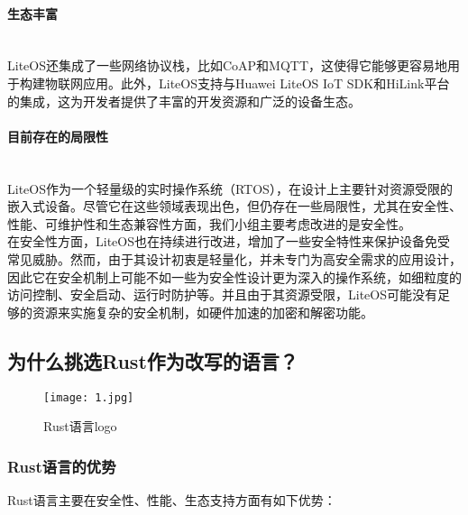 \documentclass{ctexart}
\begin{document}
\paragraph{生态丰富} \ \\
\indent LiteOS还集成了一些网络协议栈，比如CoAP和MQTT，这使得它能够更容易地用于构建物联网应用。此外，LiteOS支持与Huawei LiteOS IoT SDK和HiLink平台的集成，这为开发者提供了丰富的开发资源和广泛的设备生态。
\paragraph{目前存在的局限性}\ \\
\indent LiteOS作为一个轻量级的实时操作系统（RTOS），在设计上主要针对资源受限的嵌入式设备。尽管它在这些领域表现出色，但仍存在一些局限性，尤其在安全性、性能、可维护性和生态兼容性方面，我们小组主要考虑改进的是安全性。\\
\indent 在安全性方面，LiteOS也在持续进行改进，增加了一些安全特性来保护设备免受常见威胁。然而，由于其设计初衷是轻量化，并未专门为高安全需求的应用设计，因此它在安全机制上可能不如一些为安全性设计更为深入的操作系统，如细粒度的访问控制、安全启动、运行时防护等。并且由于其资源受限，LiteOS可能没有足够的资源来实施复杂的安全机制，如硬件加速的加密和解密功能。
\subsection{为什么挑选Rust作为改写的语言？}
\begin{figure}[h]
\centering
\texttt{[image: 1.jpg]}
\caption{Rust语言logo}
\end{figure}
\subsubsection{Rust语言的优势}
Rust语言主要在安全性、性能、生态支持方面有如下优势：
\end{document}
